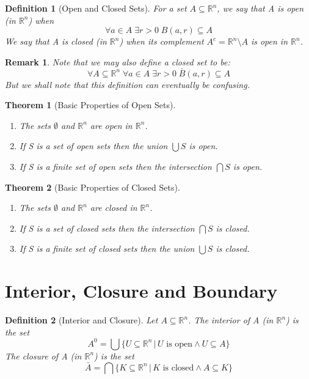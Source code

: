\documentclass[11pt, oneside]{book}
\theoremstyle{break}
\newtheorem{thm}{Theorem}[section]
\newtheorem*{remark}{Remark}
\newtheorem{defn}{Definition}[section]
\newcommand{\bb}[1]{\mathbb{#1}}		%
\begin{document}
\begin{defn}[Open and Closed Sets]
	For a set $A \subseteq \bb{R}^n$, we say that A is open (in $\bb{R}^n$) when
	\begin{equation*}
		\forall a \in A \; \exists r > 0 \; B(a, r) \subseteq A
	\end{equation*}
	We say that A is closed (in $\bb{R}^n$) when its complement $A^c = \bb{R}^n \setminus A$ is open in $\bb{R}^n$.
\end{defn}

\begin{remark}
	Note that we may also define a closed set to be:
	\begin{equation*}
		\forall A \subseteq \bb{R}^n \; \forall a \in A \; \exists r > 0 \; \bar{B}(a, r) \subseteq A
	\end{equation*}
	But we shall note that this definition can eventually be confusing.
\end{remark}

\begin{thm}[Basic Properties of Open Sets]
	\begin{enumerate}
		\item The sets $\emptyset$ and $\bb{R}^n$ are open in $\bb{R}^n$.
		\item If S is a set of open sets then the union $\bigcup S$ is open.
		\item If S is a finite set of open sets then the intersection $\bigcap S$ is open.
	\end{enumerate}
\end{thm}

\begin{thm}[Basic Properties of Closed Sets]
	\begin{enumerate}
		\item The sets $\emptyset$ and $\bb{R}^n$ are closed in $\bb{R}^n$.
		\item If S is a set of closed sets then the intersection $\bigcap S$ is closed.
		\item If S is a finite set of closed sets then the union $\bigcup S$ is closed.
	\end{enumerate}
\end{thm}


\section{Interior, Closure and Boundary}

\begin{defn}[Interior and Closure]
	Let $A \subseteq \bb{R}^n$. The interior of A (in $\bb{R}^n$) is the set
	\begin{equation*}
		A^0 = \bigcup \{ U \subseteq \bb{R}^n \, | \, U \text{ is open} \land U \subseteq A\}
	\end{equation*}
	The closure of A (in $\bb{R}^n$) is the set
	\begin{equation*}
		\bar{A} = \bigcap \{ K \subseteq \bb{R}^n \, | \, K \text{ is closed} \land A \subseteq K\}
	\end{equation*}
\end{defn}
\end{document}
